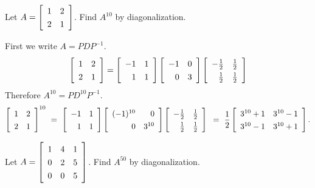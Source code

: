 \documentclass{ximera}
\author{Zack Reed}
\begin{document}
    \begin{exercise}
      Let $A = \startmat{rr}
        1 & 2 \\
        2 & 1
      \stopmat$. Find $A^{10}$ by diagonalization.
      \begin{solution}
        First we write $A = PDP^{-1}$.
        \begin{equation*}
          \def\arraystretch{1.3}
          \startmat{rr}
            1 & 2 \\
            2 & 1
          \stopmat
          =
          \startmat{rr}
            -1 & 1 \\
            1 & 1
          \stopmat
          \startmat{rr}
            -1 & 0 \\
            0 & 3
          \stopmat
          \startmat{rr}
            -\frac{1}{2} & \frac{1}{2} \\
            \frac{1}{2} & \frac{1}{2}
          \stopmat
        \end{equation*}
        Therefore $A^{10} = PD^{10}P^{-1}$.
        \begin{equation*}
          \def\arraystretch{1.3}
          \startmat{rr}
            1 & 2 \\
            2 & 1
          \stopmat^{10}
          ~=~
          \startmat{rr}
            -1 & 1 \\
            1 & 1
          \stopmat
          \startmat{rr}
            (-1)^{10} & 0 \\
            0 & 3^{10}
          \stopmat
          \startmat{rr}
            -\frac{1}{2} & \frac{1}{2} \\
            \frac{1}{2} & \frac{1}{2}
          \stopmat \\
          ~=~
          \frac{1}{2}\startmat{cc}
            3^{10}+1 & 3^{10}-1 \\
            3^{10}-1 & 3^{10}+1
          \stopmat.
        \end{equation*}
      \end{solution}
    \end{exercise}
    
    \begin{exercise}
      Let $A = \startmat{rrr}
        1 & 4 & 1 \\
        0 & 2 & 5 \\
        0 & 0 & 5
      \stopmat$. Find $A^{50}$ by diagonalization.
    \end{exercise}
    
\end{document}
